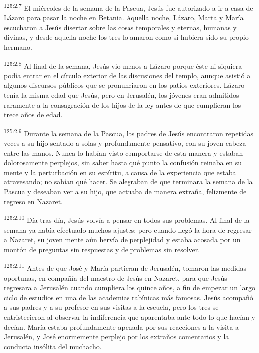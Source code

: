 \par
\textsuperscript{125:2.7} El miércoles de la semana de la Pascua, Jesús fue autorizado a ir a casa de Lázaro para pasar la noche en Betania. Aquella noche, Lázaro, Marta y María escucharon a Jesús disertar sobre las cosas temporales y eternas, humanas y divinas, y desde aquella noche los tres lo amaron como si hubiera sido su propio hermano.

\par
\textsuperscript{125:2.8} Al final de la semana, Jesús vio menos a Lázaro porque éste ni siquiera podía entrar en el círculo exterior de las discusiones del templo, aunque asistió a algunos discursos públicos que se pronunciaron en los patios exteriores. Lázaro tenía la misma edad que Jesús, pero en Jerusalén, los jóvenes eran admitidos raramente a la consagración de los hijos de la ley antes de que cumplieran los trece años de edad.

\par
\textsuperscript{125:2.9} Durante la semana de la Pascua, los padres de Jesús encontraron repetidas veces a su hijo sentado a solas y profundamente pensativo, con su joven cabeza entre las manos. Nunca lo habían visto comportarse de esta manera y estaban dolorosamente perplejos, sin saber hasta qué punto la confusión reinaba en su mente y la perturbación en su espíritu, a causa de la experiencia que estaba atravesando; no sabían qué hacer. Se alegraban de que terminara la semana de la Pascua y deseaban ver a su hijo, que actuaba de manera extraña, felizmente de regreso en Nazaret.

\par
\textsuperscript{125:2.10} Día tras día, Jesús volvía a pensar en todos sus problemas. Al final de la semana ya había efectuado muchos ajustes; pero cuando llegó la hora de regresar a Nazaret, su joven mente aún hervía de perplejidad y estaba acosada por un montón de preguntas sin respuestas y de problemas sin resolver.

\par
\textsuperscript{125:2.11} Antes de que José y María partieran de Jerusalén, tomaron las medidas oportunas, en compañía del maestro de Jesús en Nazaret, para que Jesús regresara a Jerusalén cuando cumpliera los quince años, a fin de empezar un largo ciclo de estudios en una de las academias rabínicas más famosas. Jesús acompañó a sus padres y a su profesor en sus visitas a la escuela, pero los tres se entristecieron al observar la indiferencia que aparentaba ante todo lo que hacían y decían. María estaba profundamente apenada por sus reacciones a la visita a Jerusalén, y José enormemente perplejo por los extraños comentarios y la conducta insólita del muchacho.


